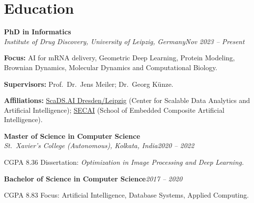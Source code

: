 \documentclass[10pt,a4paper]{article}
\begin{document}
\section{Education}
{\large\bfseries PhD in Informatics}\\
\textit{Institute of Drug Discovery, University of Leipzig, Germany}\hfill\textit{Nov 2023 – Present}\par
\textbf{Focus:} AI for mRNA delivery, Geometric Deep Learning, Protein Modeling, Brownian Dynamics, Molecular Dynamics
and Computational Biology.\par
\textbf{Supervisors:} Prof.\ Dr.\ Jens Meiler; Dr.\ Georg Künze.\par
\textbf{Affiliations:} \href{https://scads.ai/}{ScaDS.AI Dresden/Leipzig} (Center for Scalable Data Analytics and Artificial Intelligence);
\href{https://secai.org/}{SECAI} (School of Embedded Composite Artificial Intelligence).\par
\vspace{9pt}
{\large\bfseries Master of Science in Computer Science}\\
\textit{St.\ Xavier’s College (Autonomous), Kolkata, India}\hfill\textit{2020 – 2022}\par
CGPA 8.36 \enspace\textbullet\enspace Dissertation: \textit{Optimization in Image Processing and Deep Learning.}\par
\vspace{9pt}
{\large\bfseries Bachelor of Science in Computer Science}\hfill\textit{2017 – 2020}\par
CGPA 8.83 \enspace\textbullet\enspace Focus: Artificial Intelligence, Database Systems, Applied Computing.\par

\end{document}
